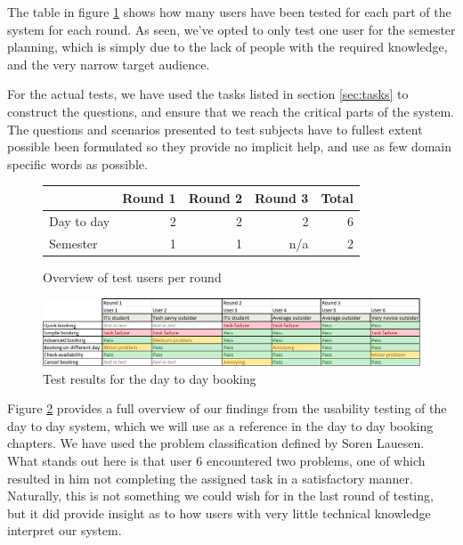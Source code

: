 The table in figure \ref{fig:usa_users} shows how many users have been tested for each part of the system for each round. As seen, we've opted to only test one user for the semester planning, which is simply due to the lack of people with the required knowledge, and the very narrow target audience.

For the actual tests, we have used the tasks listed in section \ref{sec:tasks} to construct the questions, and ensure that we reach the critical parts of the system. The questions and scenarios presented to test subjects have to fullest extent possible been formulated so they provide no implicit help, and use as few domain specific words as possible.\cite{lauesen}

\begin{figure}[htb]
\begin{center}
\leavevmode
	\begin{tabular}{|l|r|r|r||r|}
		\hline
		 & Round 1 & Round 2 & Round 3 & Total \\ \hline
		Day to day & 2 & 2 & 2 & 6\\ \hline
		Semester & 1 & 1 & n/a & 2 \\ \hline
	\end{tabular}
\end{center}
\caption{Overview of test users per round}
\label{fig:usa_users}
\end{figure}

\begin{figure}[htb]
\begin{center}
\leavevmode
\includegraphics[width=1\textwidth]{images/result_day}
\end{center}
\caption{Test results for the day to day booking}
\label{fig:results_day}
\end{figure}

Figure \ref{fig:results_day} provides a full overview of our findings from the usability testing of the day to day system, which we will use as a reference in the day to day booking chapters. We have used the problem classification defined by Soren Lauesen\cite{lauesen}.\\
What stands out here is that user 6 encountered two problems, one of which resulted in him not completing the assigned task in a satisfactory manner. Naturally, this is not something we could wish for in the last round of testing, but it did provide insight as to how users with very little technical knowledge interpret our system.

